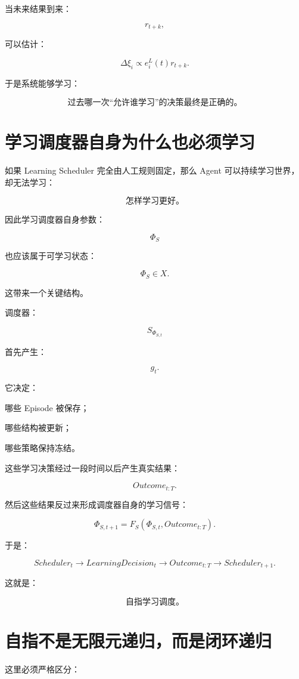 当未来结果到来：

\[
r_{t+k},
\]

可以估计：

\[
\Delta\xi_i
\propto
e_i^L(t)r_{t+k}.
\]

于是系统能够学习：

\[
\boxed{
\text{过去哪一次“允许谁学习”的决策最终是正确的。}
}
\]


\section{学习调度器自身为什么也必须学习}

如果 Learning Scheduler 完全由人工规则固定，那么 Agent 可以持续学习世界，却无法学习：

\[
\boxed{
\text{怎样学习更好。}
}
\]

因此学习调度器自身参数：

\[
\Phi_S
\]

也应该属于可学习状态：

\[
\boxed{
\Phi_S\in X.
}
\]

这带来一个关键结构。

调度器：

\[
S_{\Phi_{S,t}}
\]

首先产生：

\[
g_t.
\]

它决定：

哪些 Episode 被保存；

哪些结构被更新；

哪些策略保持冻结。

这些学习决策经过一段时间以后产生真实结果：

\[
Outcome_{t:T}.
\]

然后这些结果反过来形成调度器自身的学习信号：

\[
\boxed{
\Phi_{S,t+1}
=
F_S
(
\Phi_{S,t},
Outcome_{t:T}
).
}
\]

于是：

\[
\boxed{
Scheduler_t
\rightarrow
LearningDecision_t
\rightarrow
Outcome_{t:T}
\rightarrow
Scheduler_{t+1}.
}
\]

这就是：

\[
\boxed{
\textbf{自指学习调度。}
}
\]


\section{自指不是无限元递归，而是闭环递归}

这里必须严格区分：

